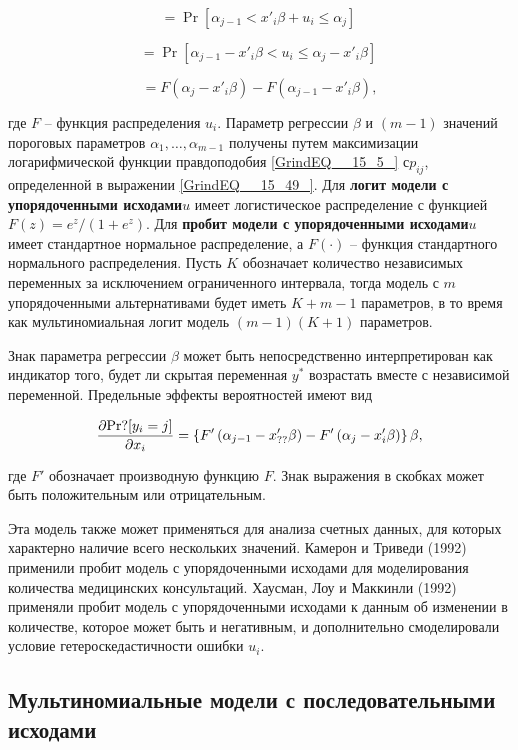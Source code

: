 \[={\Pr  \left[{\alpha }_{j-1}<x'_i\beta +u_i\le {\alpha }_j\right]\ }\] 

\begin{equation} \label{GrindEQ__15_43_} ={\Pr  \left[{\alpha }_{j-1}-x'_i\beta <u_i\le {\alpha }_j-x'_i\beta \right]\ } \end{equation} 

\[=F\left({\alpha }_j-x'_i\beta \right)-F\left({\alpha }_{j-1}-x'_i\beta \right),\] 

где $F$ -- функция распределения $u_i$. Параметр регрессии $\beta $ и $(m-1)$ значений пороговых параметров ${\alpha }_1,\dots ,{\alpha }_{m-1}$ получены путем максимизации логарифмической функции правдоподобия \eqref{GrindEQ__15_5_} с$p_{ij}$, определенной в выражении \eqref{GrindEQ__15_49_}. Для \textbf{логит модели с упорядоченными исходами}$u$ имеет логистическое распределение с функцией $F\left(z\right)={e^z}/{(1+e^z)}$. Для \textbf{пробит модели с упорядоченными исходами}$u$ имеет стандартное нормальное распределение, а $F(\cdot )$ -- функция стандартного нормального распределения. Пусть $K$ обозначает количество независимых переменных за исключением ограниченного интервала, тогда модель с $m$ упорядоченными альтернативами будет иметь $K+m-1$ параметров, в то время как мультиномиальная логит модель $(m-1)(K+1)$ параметров.

Знак параметра регрессии $\beta $ может быть непосредственно интерпретирован как индикатор того, будет ли скрытая переменная $y^*$ возрастать вместе с независимой переменной. Предельные эффекты вероятностей имеют вид

\[\frac{\partial {\rm Pr}?[y_i=j]}{\partial x_i}=\left\{F'\left({\alpha }_{j-1}-x'_{??}\beta \right)-F'\left({\alpha }_j-x'_i\beta \right)\right\}\beta ,\] 

где $F'$ обозначает производную функцию $F$. Знак выражения в скобках может быть положительным или отрицательным.

Эта модель также может применяться для анализа счетных данных, для которых характерно наличие всего нескольких значений. Камерон и Триведи (1992) применили пробит модель с упорядоченными исходами для моделирования количества медицинских консультаций. Хаусман, Лоу и Маккинли (1992) применяли пробит модель с упорядоченными исходами к данным об изменении в количестве, которое может быть и негативным, и дополнительно смоделировали условие гетероскедастичности ошибки $u_i$.

\subsection{Мультиномиальные модели с последовательными исходами}

